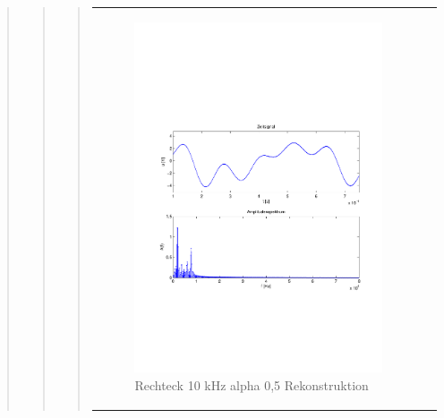 \begin{quote}
\begin{quote}
\begin{quote}
\begin{center}
\begin{tabular}{ll}
            \hspace{-5cm}
                \begin{minipage}{0.6\textwidth}
                    \begin{figure}[H]
                        \includegraphics[scale=0.55, trim = 16mm 70mm 16mm 85mm, clip]{Bilder/shaperec10_05}
                          \caption{Rechteck 10 kHz alpha 0,5 Rekonstruktion}
		                  \label{fig:shaperec10_05}
                    \end{figure}
                \end{minipage}
                

\end{tabular}
\end{center}
\end{quote}
\end{quote}
\end{quote}
